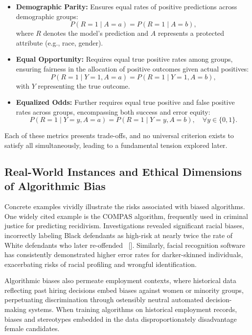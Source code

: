 \begin{itemize}
  \item \textbf{Demographic Parity:} Ensures equal rates of positive
    predictions across demographic groups:
    \[
      P(R = 1 \mid A = a) = P(R = 1 \mid A = b),
    \]
    where \(R\) denotes the model's prediction and \(A\) represents a
    protected attribute (e.g., race, gender).

  \item \textbf{Equal Opportunity:} Requires equal true positive
    rates among groups, ensuring fairness in the
    allocation of positive outcomes given actual positives:
    \[
      P(R = 1 \mid Y = 1, A = a) = P(R = 1 \mid Y = 1, A = b),
    \]
    with \(Y\) representing the true outcome.

  \item \textbf{Equalized Odds:} Further requires equal true positive
    and false positive rates across groups,
    encompassing both success and error equity:
    \[
      P(R = 1 \mid Y = y, A = a) = P(R = 1 \mid Y = y, A = b), \quad
      \forall y \in \{0, 1\}.
    \]
\end{itemize}

Each of these metrics presents trade-offs, and no universal criterion
exists to satisfy all simultaneously,
leading to a fundamental tension explored later.

\subsection{Real-World Instances and Ethical Dimensions of
Algorithmic Bias}\label{subsec:real_world_bias}

Concrete examples vividly illustrate the risks associated with biased
algorithms. One widely cited example is the COMPAS algorithm,
frequently used in criminal justice for predicting recidivism.
Investigations revealed significant racial biases, incorrectly
labeling Black defendants as high-risk at nearly twice the rate of
White defendants who later re-offended ~[\cite{angwin2016machine}].
Similarly, facial recognition software has consistently demonstrated
higher error rates for darker-skinned individuals, exacerbating risks
of racial profiling and wrongful identification.

Algorithmic biases also permeate employment contexts, where
historical data reflecting past hiring decisions embed biases against
women or minority groups, perpetuating discrimination through
ostensibly neutral automated decision-making systems. When training
algorithms on historical employment records, biases and stereotypes
embedded in the data disproportionately disadvantage female candidates.

